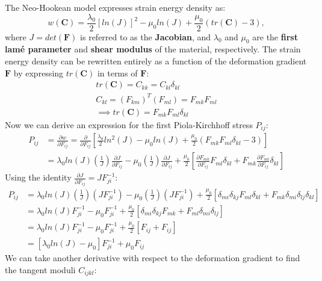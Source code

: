 \documentclass[]{spie}  %
\begin{document}
The Neo-Hookean model expresses strain energy density as:
\begin{equation}
\label{eq: strain energy density}
w(\bm{C}) = \frac{\lambda_0}{2}[ln(J)]^2 - \mu_0 ln(J) + \frac{\mu_0}{2}(tr(\bm{C}) - 3),
\end{equation}
where $J = det(\bm{F})$ is referred to as the \textbf{Jacobian}, and $\lambda_0$ and $\mu_0$ are the \textbf{first lam\'e parameter} and \textbf{shear modulus} of the material, respectively. The strain energy density can be rewritten entirely as a function of the deformation gradient $\bm{F}$ by expressing $tr(\bm{C})$ in terms of $\bm{F}$:
\begin{gather*}
tr(\bm{C}) = C_{kk} = C_{kl}\delta_{kl} \\
C_{kl} = (F_{km})^T(F_{ml}) = F_{mk}F_{ml} \\
\implies tr(\bm{C}) = F_{mk}F_{ml}\delta_{kl}
\end{gather*}
Now we can derive an expression for the first Piola-Kirchhoff stress $P_{ij}$:
\begin{align}
P_{ij} 	&= \frac{\partial w}{\partial F_{ij}} = \frac{\partial}{\partial F_{ij}} \left[\frac{\lambda_0}{2}ln^2(J) - \mu_0 ln(J) + \frac{\mu_0}{2}(F_{mk}F_{ml}\delta_{kl} - 3)\right] \\
		&= \lambda_0 ln(J) \left(\frac{1}{J}\right) \frac{\partial J}{\partial F_{ij}} - \mu_0 \left(\frac{1}{J}\right) \frac{\partial J}{\partial F_{ij}} + \frac{\mu_0}{2} \left[\frac{\partial F_{mk}}{\partial F_{ij}} F_{ml} \delta_{kl} + F_{mk} \frac{\partial F_{ml}}{\partial F_{ij}} \delta_{kl}\right]
\end{align}
Using the identity $\frac{\partial J}{\partial F_{ij}} = J F^{-1}_{ji}$:
\begin{align}
P_{ij} 	&= \lambda_0 ln(J) \left(\frac{1}{J}\right) (J F^{-1}_{ji}) - \mu_0 \left(\frac{1}{J}\right) (J F^{-1}_{ji}) + \frac{\mu_0}{2} \left[\delta_{mi}\delta_{kj} F_{ml} \delta_{kl} + F_{mk} \delta_{mi}\delta_{lj} \delta_{kl}\right] \\
		&= \lambda_0 ln(J) F^{-1}_{ji} - \mu_0 F^{-1}_{ji} + \frac{\mu_0}{2} \left[\delta_{mi}\delta_{kj} F_{mk} + F_{ml} \delta_{mi}\delta_{lj}\right] \\
		&= \lambda_0 ln(J) F^{-1}_{ji} - \mu_0 F^{-1}_{ji} + \frac{\mu_0}{2} \left[F_{ij} + F_{ij}\right] \\
		&= \left[\lambda_0 ln(J) - \mu_0 \right]F^{-1}_{ji} + \mu_0 F_{ij}
\end{align}
We can take another derivative with respect to the deformation gradient to find the tangent moduli $C_{ijkl}$:
\end{document}
